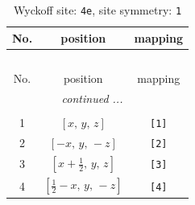 \documentclass[fleqn,8pt]{jsarticle}
\begin{document}
\begin{longtable}{ccc}
\caption{Wyckoff site: {\tt 4e}, site symmetry: {\tt 1}}
 \\
 \hline \hline
No. & position & mapping \\ \hline \endfirsthead

\multicolumn{2}{l}{\tablename\ \thetable{}} \\
 \hline \hline
No. & position & mapping \\ \hline \endhead

 \hline \hline
\multicolumn{2}{r}{\footnotesize\it continued ...} \\ \endfoot

 \hline \hline
\multicolumn{2}{r}{} \\ \endlastfoot

1 & $\left[ x,\, y,\, z \right]$ & {\tt [1]} \\ \hline
2 & $\left[ - x,\, y,\, - z \right]$ & {\tt [2]} \\ \hline
3 & $\left[ x + \frac{1}{2},\, y,\, z \right]$ & {\tt [3]} \\ \hline
4 & $\left[ \frac{1}{2} - x,\, y,\, - z \right]$ & {\tt [4]} \\
\end{longtable}
\end{document}
